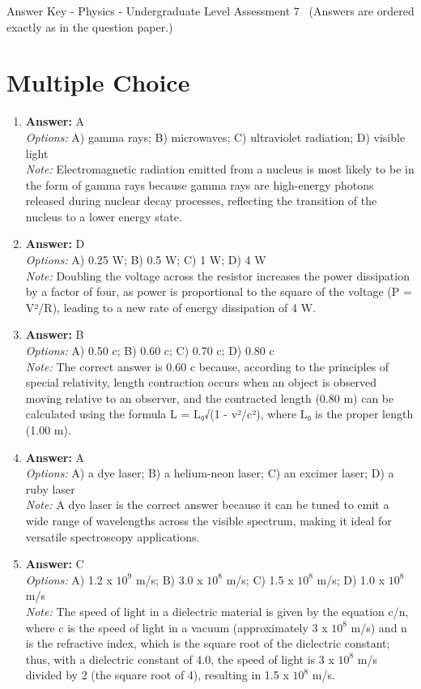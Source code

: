 \documentclass[12pt]{article}
\begin{document}
\begin{center}
Answer Key - Physics - Undergraduate Level Assessment 7 \
\small (Answers are ordered exactly as in the question paper.)
\end{center}

\section*{Multiple Choice}
\begin{enumerate}[label=\arabic*.]
\item \textbf{Answer:} A
\\ \textit{Options:} A) gamma rays; B) microwaves; C) ultraviolet radiation; D) visible light
\\ \textit{Note:} Electromagnetic radiation emitted from a nucleus is most likely to be in the form of gamma rays because gamma rays are high-energy photons released during nuclear decay processes, reflecting the transition of the nucleus to a lower energy state.
\item \textbf{Answer:} D
\\ \textit{Options:} A) 0.25 W; B) 0.5 W; C) 1 W; D) 4 W
\\ \textit{Note:} Doubling the voltage across the resistor increases the power dissipation by a factor of four, as power is proportional to the square of the voltage (P = V²/R), leading to a new rate of energy dissipation of 4 W.
\item \textbf{Answer:} B
\\ \textit{Options:} A) 0.50 c; B) 0.60 c; C) 0.70 c; D) 0.80 c
\\ \textit{Note:} The correct answer is 0.60 c because, according to the principles of special relativity, length contraction occurs when an object is observed moving relative to an observer, and the contracted length (0.80 m) can be calculated using the formula L = L₀√(1 - v²/c²), where L₀ is the proper length (1.00 m).
\item \textbf{Answer:} A
\\ \textit{Options:} A) a dye laser; B) a helium-neon laser; C) an excimer laser; D) a ruby laser
\\ \textit{Note:} A dye laser is the correct answer because it can be tuned to emit a wide range of wavelengths across the visible spectrum, making it ideal for versatile spectroscopy applications.
\item \textbf{Answer:} C
\\ \textit{Options:} A) 1.2 x $10^9$ m/s; B) 3.0 x $10^8$ m/s; C) 1.5 x $10^8$ m/s; D) 1.0 x $10^8$ m/s
\\ \textit{Note:} The speed of light in a dielectric material is given by the equation c/n, where c is the speed of light in a vacuum (approximately 3 x $10^8$ m/s) and n is the refractive index, which is the square root of the dielectric constant; thus, with a dielectric constant of 4.0, the speed of light is 3 x $10^8$ m/s divided by 2 (the square root of 4), resulting in 1.5 x $10^8$ m/s.
\end{enumerate}
\end{document}
